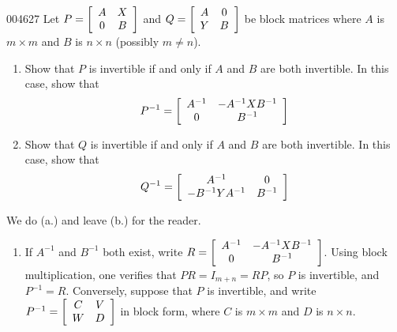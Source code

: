 \begin{example}{}{004627}
Let $P = \left[ \begin{array}{cc}
A & X \\
0 & B
\end{array} \right]$
 and $Q = \left[ \begin{array}{cc}
 A & 0 \\
 Y & B
 \end{array} \right]$
 be block matrices where $A$ is $m \times m$ and $B$ is $n \times n$ (possibly $m \neq n$).


\begin{enumerate}[label={\alph*.}]
\item Show that $P$ is invertible if and only if $A$ and $B$ are both invertible. In this case, show that 
\begin{equation*}
P^{-1} = \left[ \begin{array}{cc}
A^{-1} & -A^{-1}XB^{-1} \\
0 & B^{-1}
\end{array} \right]
\end{equation*}


\item Show that $Q$ is invertible if and only if $A$ and $B$ are both invertible. In this case, show that 
\begin{equation*}
Q^{-1} = \left[ \begin{array}{cc}
A^{-1} & 0 \\
-B^{-1}YA^{-1} & B^{-1}
\end{array} \right]
\end{equation*}


\end{enumerate}

\begin{solution}
  We do (a.) and leave (b.) for the reader.


\begin{enumerate}[label={\alph*.}]
\item If $A^{-1}$ and $B^{-1}$ both exist, write $R = \left[ \begin{array}{cc}
A^{-1} & -A^{-1}XB^{-1} \\
0 & B^{-1}
\end{array} \right]$. Using block multiplication, one verifies that $PR = I_{m+n} = RP$, so $P$ is invertible, and $P^{-1} = R$. Conversely, suppose that $P$ is invertible, and write $P^{-1} = \left[ \begin{array}{cc}
 C & V \\
 W & D
 \end{array} \right]$
 in block form, where $C$ is $m \times m$ and $D$ is $n \times n$.



\end{enumerate}
\end{solution}
\end{example}
